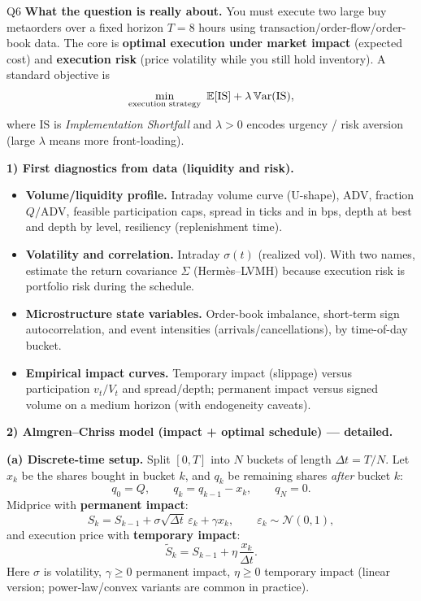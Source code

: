 \begin{solutionbox}{Q6}
\textbf{What the question is really about.} You must execute two large buy metaorders over a fixed horizon \(T=8\) hours using transaction/order-flow/order-book data. The core is \textbf{optimal execution under market impact} (expected cost) and \textbf{execution risk} (price volatility while you still hold inventory). A standard objective is
\[
\min_{\text{execution strategy}}\ \mathbb{E}[\mathrm{IS}] + \lambda\,\mathbb{V}\mathrm{ar}(\mathrm{IS}),
\]
where \(\mathrm{IS}\) is \emph{Implementation Shortfall} and \(\lambda>0\) encodes urgency / risk aversion (large \(\lambda\) means more front-loading).

\medskip
\textbf{1) First diagnostics from data (liquidity and risk).}
\begin{itemize}[leftmargin=*]
  \item \textbf{Volume/liquidity profile.} Intraday volume curve (U-shape), ADV, fraction \(Q/\mathrm{ADV}\), feasible participation caps, spread in ticks and in bps, depth at best and depth by level, resiliency (replenishment time).
  \item \textbf{Volatility and correlation.} Intraday \(\sigma(t)\) (realized vol). With two names, estimate the return covariance \(\Sigma\) (Herm\`es--LVMH) because execution risk is portfolio risk during the schedule.
  \item \textbf{Microstructure state variables.} Order-book imbalance, short-term sign autocorrelation, and event intensities (arrivals/cancellations), by time-of-day bucket.
  \item \textbf{Empirical impact curves.} Temporary impact (slippage) versus participation \(v_t/V_t\) and spread/depth; permanent impact versus signed volume on a medium horizon (with endogeneity caveats).
\end{itemize}

\medskip
\textbf{2) Almgren--Chriss model (impact + optimal schedule) --- detailed.}

\smallskip
\textbf{(a) Discrete-time setup.} Split \([0,T]\) into \(N\) buckets of length \(\Delta t=T/N\). Let \(x_k\) be the shares bought in bucket \(k\), and \(q_k\) be remaining shares \emph{after} bucket \(k\):
\[
q_0=Q,\qquad q_k=q_{k-1}-x_k,\qquad q_N=0.
\]
Midprice with \textbf{permanent impact}:
\[
S_k=S_{k-1}+\sigma\sqrt{\Delta t}\,\varepsilon_k+\gamma x_k,
\qquad \varepsilon_k\sim\mathcal N(0,1),
\]
and execution price with \textbf{temporary impact}:
\[
\tilde S_k=S_{k-1}+\eta\,\frac{x_k}{\Delta t}.
\]
Here \(\sigma\) is volatility, \(\gamma\ge 0\) permanent impact, \(\eta\ge 0\) temporary impact (linear version; power-law/convex variants are common in practice).


\end{solutionbox}
